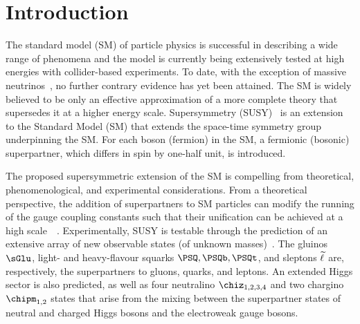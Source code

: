 \section{Introduction}
\label{sec:introduction}

The standard model (SM) of particle physics is successful in
describing a wide range of phenomena and the model is currently being
extensively tested at high energies with collider-based experiments.
To date, with the exception of massive neutrinos~\cite{Fukuda:1998mi,
  Ahmad:2001an, Ahmad:2002jz}, no further contrary evidence has yet
been attained. The SM is widely believed to be only an effective
approximation of a more complete theory that supersedes it at a higher
energy scale. Supersymmetry (SUSY)~\cite{ref:SUSY-1, ref:SUSY0,
  ref:SUSY3, ref:SUSY1} is an extension to the Standard Model (SM)
that extends the space-time symmetry group underpinning the SM. For
each boson (fermion) in the SM, a fermionic (bosonic) superpartner,
which differs in spin by one-half unit, is introduced.

The proposed supersymmetric extension of the SM is compelling from
theoretical, phenomenological, and experimental considerations.  From
a theoretical perspective, the addition of superpartners to SM
particles can modify the running of the gauge coupling constants such
that their unification can be achieved at a high
scale~~\cite{Dimopoulos:1981yj, Ibanez:1981yh, Marciano:1981un}.
Experimentally, SUSY is testable through the prediction of an
extensive array of new observable states (of unknown
masses)~\cite{ref:SUSY4, ref:SUSY2}. The gluinos $\sGlu$, light- and
heavy-flavour squarks $\PSQ, \PSQb, \PSQt$, and sleptons $\widetilde{\ell}$ are,
respectively, the superpartners to gluons, quarks, and leptons. An
extended Higgs sector is also predicted, as well as four neutralino
$\chiz_{1,2,3,4}$ and two chargino $\chipm_{1,2}$ states that arise
from the mixing between the superpartner states of neutral and charged
Higgs bosons and the electroweak gauge bosons.

